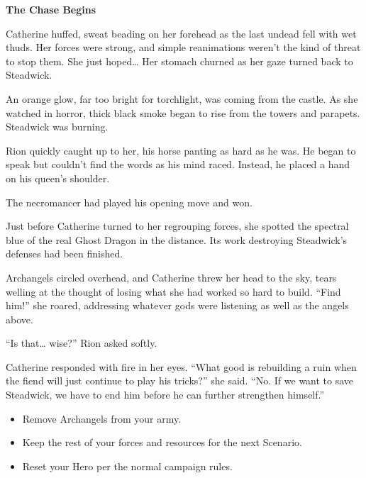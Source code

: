 \begin{multicols*}{2}
\textbf{The Chase Begins}

Catherine huffed, sweat beading on her forehead as the last undead fell with wet thuds.
Her forces were strong, and simple reanimations weren't the kind of threat to stop them.
She just hoped… Her stomach churned as her gaze turned back to Steadwick.

An orange glow, far too bright for torchlight, was coming from the castle.
As she watched in horror, thick black smoke began to rise from the towers and parapets.
Steadwick was burning.

Rion quickly caught up to her, his horse panting as hard as he was.
He began to speak but couldn't find the words as his mind raced.
Instead, he placed a hand on his queen's shoulder.

The necromancer had played his opening move and won.

Just before Catherine turned to her regrouping forces, she spotted the spectral blue of the real Ghost Dragon in the distance.
Its work destroying Steadwick's defenses had been finished.

Archangels circled overhead, and Catherine threw her head to the sky, tears welling at the thought of losing what she had worked so hard to build.
``Find him!'' she roared, addressing whatever gods were listening as well as the angels above.

``Is that… wise?'' Rion asked softly.

Catherine responded with fire in her eyes.
``What good is rebuilding a ruin when the fiend will just continue to play his tricks?'' she said.
``No.
If we want to save Steadwick, we have to end him before he can further strengthen himself.''

\begin{itemize}
  \item \textcolor{darkcandyapplered}{Remove Archangels from your army.}
  \item \textcolor{darkcandyapplered}{Keep the rest of your forces and resources for the next Scenario.}
  \item \textcolor{darkcandyapplered}{Reset your Hero per the normal campaign rules.}
\end{itemize}

\columnbreak

\begin{center}
\end{center}

\end{multicols*}
